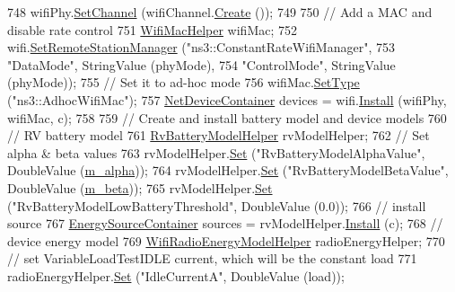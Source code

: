 \begin{DoxyCode}
748   wifiPhy.\hyperlink{classns3_1_1YansWifiPhyHelper_ad2e9a27587dd4ff320435c93cc2676de}{SetChannel} (wifiChannel.\hyperlink{classns3_1_1YansWifiChannelHelper_a0532e292ab9452f3cf630c848708e563}{Create} ());
749 
750   \textcolor{comment}{// Add a MAC and disable rate control}
751   \hyperlink{classns3_1_1WifiMacHelper}{WifiMacHelper} wifiMac;
752   wifi.\hyperlink{classns3_1_1WifiHelper_a3d01b178aeb2de246ab5a3aa5638ce24}{SetRemoteStationManager} (\textcolor{stringliteral}{"ns3::ConstantRateWifiManager"},
753                                 \textcolor{stringliteral}{"DataMode"}, StringValue (phyMode),
754                                 \textcolor{stringliteral}{"ControlMode"}, StringValue (phyMode));
755   \textcolor{comment}{// Set it to ad-hoc mode}
756   wifiMac.\hyperlink{classns3_1_1WifiMacHelper_a382d8df76a1dd7007179d1963b4b6bc6}{SetType} (\textcolor{stringliteral}{"ns3::AdhocWifiMac"});
757   \hyperlink{classns3_1_1NetDeviceContainer}{NetDeviceContainer} devices = wifi.\hyperlink{classns3_1_1WifiHelper_a451b3d33fa1497c22f06c5451f57a127}{Install} (wifiPhy, wifiMac, c);
758 
759   \textcolor{comment}{// Create and install battery model and device models}
760   \textcolor{comment}{// RV battery model}
761   \hyperlink{classns3_1_1RvBatteryModelHelper}{RvBatteryModelHelper} rvModelHelper;
762   \textcolor{comment}{// Set alpha & beta values}
763   rvModelHelper.\hyperlink{classns3_1_1RvBatteryModelHelper_a28f5eedc180d45310324ca3bd1868af1}{Set} (\textcolor{stringliteral}{"RvBatteryModelAlphaValue"}, DoubleValue (\hyperlink{classBatteryLifetimeTest_ab0ea71a3ce518e4876ee4a0efe8a967c}{m\_alpha}));
764   rvModelHelper.\hyperlink{classns3_1_1RvBatteryModelHelper_a28f5eedc180d45310324ca3bd1868af1}{Set} (\textcolor{stringliteral}{"RvBatteryModelBetaValue"}, DoubleValue (\hyperlink{classBatteryLifetimeTest_a7e071f34e550450909e80907d59923c8}{m\_beta}));
765   rvModelHelper.\hyperlink{classns3_1_1RvBatteryModelHelper_a28f5eedc180d45310324ca3bd1868af1}{Set} (\textcolor{stringliteral}{"RvBatteryModelLowBatteryThreshold"}, DoubleValue (0.0));
766   \textcolor{comment}{// install source}
767   \hyperlink{classns3_1_1EnergySourceContainer}{EnergySourceContainer} sources = rvModelHelper.\hyperlink{classns3_1_1EnergySourceHelper_ac52e48ef79c83537cc0bba02df8d91a1}{Install} (c);
768   \textcolor{comment}{// device energy model}
769   \hyperlink{classns3_1_1WifiRadioEnergyModelHelper}{WifiRadioEnergyModelHelper} radioEnergyHelper;
770   \textcolor{comment}{// set VariableLoadTestIDLE current, which will be the constant load}
771   radioEnergyHelper.\hyperlink{classns3_1_1WifiRadioEnergyModelHelper_a8fb76b591e426c6a8fcdc7fc411e3295}{Set} (\textcolor{stringliteral}{"IdleCurrentA"}, DoubleValue (load));

\end{DoxyCode}
